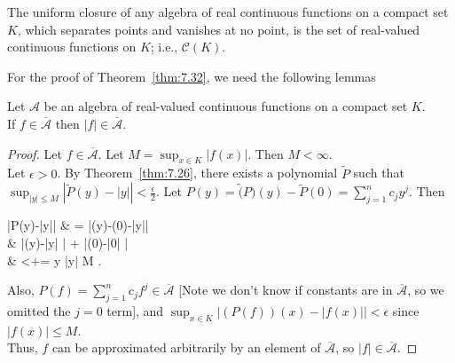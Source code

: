 \begin{thm}
	The uniform closure of any algebra of real continuous functions on a compact set $K$, which separates points and vanishes at no point, is the set of real-valued continuous functions on $K$; i.e., $\mathscr{C}(K)$.
\end{thm}
For the proof of Theorem~\ref{thm:7.32}, we need the following lemmas
\begin{lemma}[1]
	\label{lem:7.32a}
	Let $\mathscr{A}$ be an algebra of real-valued continuous functions on a compact set $K$.\\
	If $f \in \overline{\mathscr{A}}$ then $\left|f\right| \in \overline{\mathscr{A}}$.
	\begin{proof}
		Let $f \in \overline{\mathscr{A}}$. Let $M=\sup_{x \in K} \left|f(x)\right| $. Then $M<\infty$.\\
		Let $\epsilon>0$. By Theorem~\ref{thm:7.26}, there exists a polynomial $\tilde{P}$ such that $\sup_{\left|y\right| \le M} \left|\tilde{P}(y)-\left|y\right| \right| <\frac{\epsilon}{2}$.
		Let $P(y)=\tilde(P)(y)-\tilde{P}(0)= \sum_{j=1}^{n}{c_jy^{j}}$.
		Then
		\begin{flalign*}
			\left|P(y)-\left|y\right|\right| & = \left|\tilde{P}(y)-(0)-\left|y\right|\right|                                                     \\
			                                 & \le \left|(y)-\left|y\right| \right| + \left|(0)-\left|0\right| \right|                   \\
			                                 & <+=\epsilon {} y  \left|y\right|  \le M
			.\end{flalign*}
		Also, $P(f)=\sum_{j=1}^{n}{c_{j}f^{j}} \in \overline{\mathscr{A}}$ [Note we don't know if constants are in $\overline{\mathscr{A}}$, so we omitted the $j=0$ term], and $\sup_{x \in K}\left|(P(f))(x)-\left|f(x)\right| \right| <\epsilon$ since $\left|f(x)\right| \le M$.\\
		Thus, $f$ can be approximated arbitrarily by an element of $\overline{\mathscr{A}}$, so $\left|f\right| \in \overline{\mathscr{A}}$.
	\end{proof}
\end{lemma}
